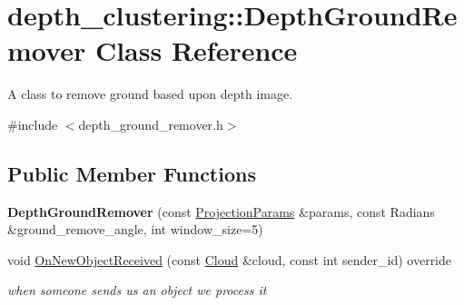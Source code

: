 \hypertarget{classdepth__clustering_1_1DepthGroundRemover}{}\section{depth\+\_\+clustering\+:\+:Depth\+Ground\+Remover Class Reference}
\label{classdepth__clustering_1_1DepthGroundRemover}


A class to remove ground based upon depth image.  




{\ttfamily \#include $<$depth\+\_\+ground\+\_\+remover.\+h$>$}

\subsection*{Public Member Functions}
\begin{DoxyCompactItemize}
\item 
\mbox{\label{classdepth__clustering_1_1DepthGroundRemover_aae9816017a747246c495de41bcece02c}} 
{\bfseries Depth\+Ground\+Remover} (const \hyperlink{classdepth__clustering_1_1ProjectionParams}{Projection\+Params} \&params, const Radians \&ground\+\_\+remove\+\_\+angle, int window\+\_\+size=5)
\item 
void \hyperlink{classdepth__clustering_1_1DepthGroundRemover_ab2c3bcc8df6cc70ad5057f5ec3bd074f}{On\+New\+Object\+Received} (const \hyperlink{classdepth__clustering_1_1Cloud}{Cloud} \&cloud, const int sender\+\_\+id) override
\begin{DoxyCompactList}\small\item\em when someone sends us an object we process it \end{DoxyCompactList}\end{DoxyCompactItemize}
